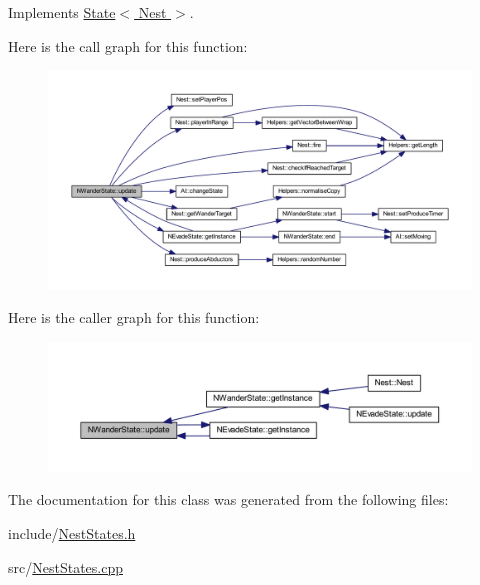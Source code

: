 Implements \hyperlink{class_state_a30b5f87ed3e3a05fafeaf898e43518ea}{State$<$ Nest $>$}.

Here is the call graph for this function\+:
\nopagebreak
\begin{figure}[H]
\begin{center}
\leavevmode
\includegraphics[width=350pt]{class_n_wander_state_aa6245a3229ba7f0231e4d2bad59a0789_cgraph}
\end{center}
\end{figure}
Here is the caller graph for this function\+:
\nopagebreak
\begin{figure}[H]
\begin{center}
\leavevmode
\includegraphics[width=350pt]{class_n_wander_state_aa6245a3229ba7f0231e4d2bad59a0789_icgraph}
\end{center}
\end{figure}


The documentation for this class was generated from the following files\+:\begin{DoxyCompactItemize}
\item 
include/\hyperlink{_nest_states_8h}{Nest\+States.\+h}\item 
src/\hyperlink{_nest_states_8cpp}{Nest\+States.\+cpp}\end{DoxyCompactItemize}
